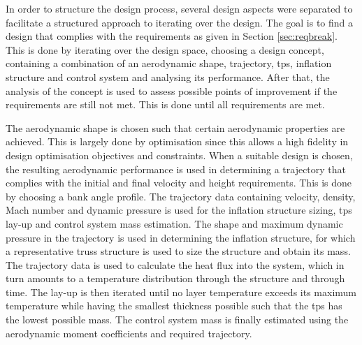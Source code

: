 In order to structure the design process, several design aspects were separated to facilitate a structured approach to iterating over the design. The goal is to find a design that complies with the requirements as given in Section \ref{sec:reqbreak}. This is done by iterating over the design space,  choosing a design concept, containing a combination of an aerodynamic shape, trajectory, \gls{tps}, inflation structure and control system and analysing its performance. After that, the analysis of the concept is used to assess possible points of improvement if the requirements are still not met. This is done until all requirements are met.


The aerodynamic shape is chosen such that certain aerodynamic properties are achieved. This is largely done by optimisation since this allows a high fidelity in design optimisation objectives and constraints. When a suitable design is chosen, the resulting aerodynamic performance is used in determining a trajectory that complies with the initial and final velocity and height requirements. This is done by choosing a bank angle profile. The trajectory data containing velocity, density, Mach number and dynamic pressure is used for the inflation structure sizing, \gls{tps} lay-up and control system mass estimation. The shape and maximum dynamic pressure in the trajectory is used in determining the inflation structure, for which a representative truss structure is used to size the structure and obtain its mass. The trajectory data is used to calculate the heat flux into the system, which in turn amounts to a temperature distribution through the structure and through time. The lay-up is then iterated until no layer temperature exceeds its maximum temperature while having the smallest thickness possible such that the \gls{tps} has the lowest possible mass. The control system mass is finally estimated using the aerodynamic moment coefficients and required trajectory.

